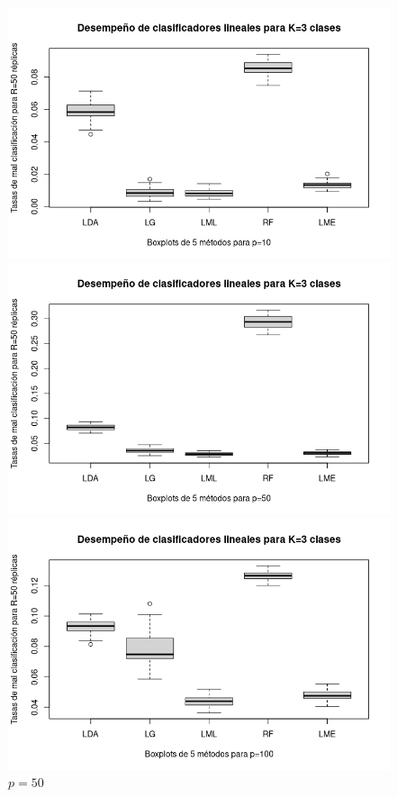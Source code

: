 \documentclass{report}
\begin{document}
  \begin{figure} [h]
  	\begin{multicols}{2}
  		\includegraphics[width=\linewidth]{3_clases_p10_sigma_II}\par 
  		\caption*{$p=10$}
  		\includegraphics[width=\linewidth]{3_clases_p50_sigma_II}\par 
  		\caption*{$p=50$}	 
  	\end{multicols}
  	\begin{multicols}{2}
  		\includegraphics[width=\linewidth]{3_clases_p100_sigma_II}\par

\end{multicols}
\end{figure}
\end{document}
